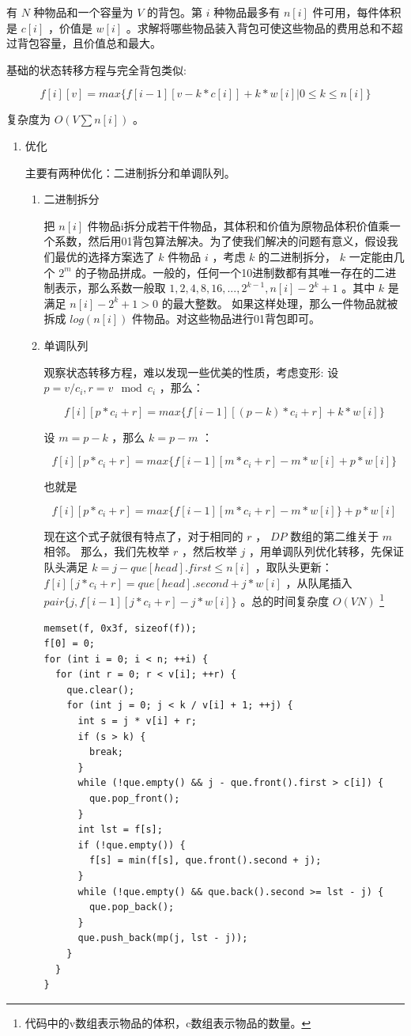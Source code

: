 \documentclass[11pt]{article}
\begin{document}
有 $N$ 种物品和一个容量为 $V$ 的背包。第 $i$ 种物品最多有 $n[i]$ 件可用，每件体积是 $c[i]$ ，价值是 $w[i]$ 。求解将哪些物品装入背包可使这些物品的费用总和不超过背包容量，且价值总和最大。

基础的状态转移方程与完全背包类似:

$$
f[i][v]=max\{f[i-1][v-k*c[i]]+k*w[i]|0 \leq k \leq n[i]\}
$$

复杂度为  $O(V  \sum n[i])$ 。

\begin{enumerate}
\item 优化
\label{sec-2-2-3-1}

主要有两种优化：二进制拆分和单调队列。

\begin{enumerate}
\item 二进制拆分
\label{sec-2-2-3-1-1}


把 $n[i]$ 件物品i拆分成若干件物品，其体积和价值为原物品体积价值乘一个系数，然后用01背包算法解决。为了使我们解决的问题有意义，假设我们最优的选择方案选了 $k$ 件物品 $i$ ，考虑 $k$ 的二进制拆分， $k$ 一定能由几个 $2^m$ 的子物品拼成。一般的，任何一个10进制数都有其唯一存在的二进制表示，那么系数一般取 $1,2,4,8,16,...,2^{k-1},n[i]-2^{k}+1$ 。其中 $k$ 是满足 $n[i]-2^k+1>0$ 的最大整数。  
如果这样处理，那么一件物品就被拆成 $log(n[i])$ 件物品。对这些物品进行01背包即可。

\item 单调队列
\label{sec-2-2-3-1-2}


观察状态转移方程，难以发现一些优美的性质，考虑变形:  
设 $p=v/c_{i},r=v \mod c_i$ ，那么：

$$
f[i][p*c_i+r]=max\{f[i-1][(p-k)*c_i+r]+k*w[i]\}
$$

设 $m=p-k$ ，那么 $k=p-m$ ：

$$
f[i][p*c_i+r]=max\{f[i-1][m*c_i+r]-m*w[i]+p*w[i]\}
$$

也就是

$$
f[i][p*c_i+r]=max\{f[i-1][m*c_i+r]-m*w[i]\}+p*w[i]
$$

现在这个式子就很有特点了，对于相同的 $r$ ， $DP$ 数组的第二维关于 $m$ 相邻。  
那么，我们先枚举 $r$ ，然后枚举 $j$ ，用单调队列优化转移，先保证队头满足 $k=j-que[head].first \leq n[i]$ ，取队头更新： $f[i][j*c_i+r]=que[head].second+j*w[i]$ ，从队尾插入 $pair\{j,f[i-1][j*c_i+r]-j*w[i]\}$ 。总的时间复杂度 $O(V N)$ \footnote{代码中的v数组表示物品的体积，c数组表示物品的数量。}

\begin{verbatim}
memset(f, 0x3f, sizeof(f));
f[0] = 0;
for (int i = 0; i < n; ++i) {
  for (int r = 0; r < v[i]; ++r) {
    que.clear();
    for (int j = 0; j < k / v[i] + 1; ++j) {
      int s = j * v[i] + r;
      if (s > k) {
        break;
      }
      while (!que.empty() && j - que.front().first > c[i]) {
        que.pop_front();
      }
      int lst = f[s];
      if (!que.empty()) {
        f[s] = min(f[s], que.front().second + j);
      }
      while (!que.empty() && que.back().second >= lst - j) {
        que.pop_back();
      }
      que.push_back(mp(j, lst - j));
    }
  }
}
\end{verbatim}
\end{enumerate}
\end{enumerate}
\end{document}
